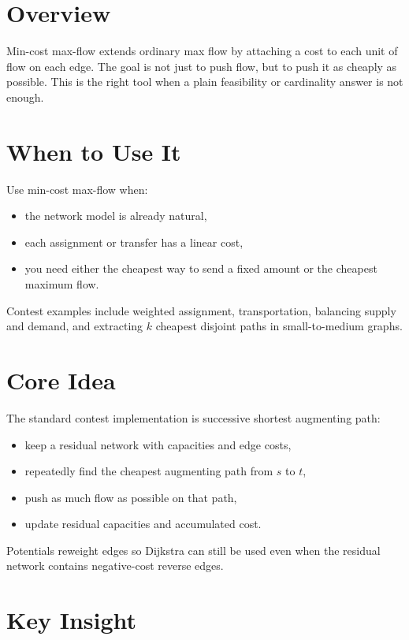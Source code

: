 \section*{Overview}

Min-cost max-flow extends ordinary max flow by attaching a cost to each unit of flow on each edge. The goal is not
just to push flow, but to push it as cheaply as possible. This is the right tool when a plain feasibility or cardinality
answer is not enough.

\section*{When to Use It}

Use min-cost max-flow when:

\begin{itemize}
  \item the network model is already natural,
  \item each assignment or transfer has a linear cost,
  \item you need either the cheapest way to send a fixed amount or the cheapest maximum flow.
\end{itemize}

Contest examples include weighted assignment, transportation, balancing supply and demand, and extracting \(k\) cheapest
disjoint paths in small-to-medium graphs.

\section*{Core Idea}

The standard contest implementation is successive shortest augmenting path:

\begin{itemize}
  \item keep a residual network with capacities and edge costs,
  \item repeatedly find the cheapest augmenting path from \(s\) to \(t\),
  \item push as much flow as possible on that path,
  \item update residual capacities and accumulated cost.
\end{itemize}

Potentials reweight edges so Dijkstra can still be used even when the residual network contains negative-cost reverse
edges.

\section*{Key Insight}

